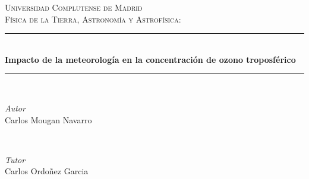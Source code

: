 \documentclass[12pt]{article}
\begin{document}
\begin{titlepage}

\newcommand{\HRule}{\rule{\linewidth}{0.5mm}} %

\center %
 

\textsc{\LARGE Universidad Complutense de Madrid}\\[1.5cm] %
\textsc{\Large Física de la Tierra, Astronomía y Astrofísica:}\\[0.5cm] %


\HRule \\[0.4cm]
{ \huge \bfseries Impacto de la meteorología en la concentración de ozono troposférico }\\[0.4cm] %
\HRule \\[1.5cm]
 

\begin{minipage}{0.4\textwidth}
\begin{flushleft} \large
\emph{Autor}\\
Carlos Mougan Navarro  %
\end{flushleft}
\end{minipage}
~
\begin{minipage}{0.4\textwidth}
\begin{flushright} \large
\emph{Tutor} \\
Carlos Ordoñez Garcia%
\end{flushright}
\end{minipage}\\[2cm]


\end{titlepage}
\end{document}
